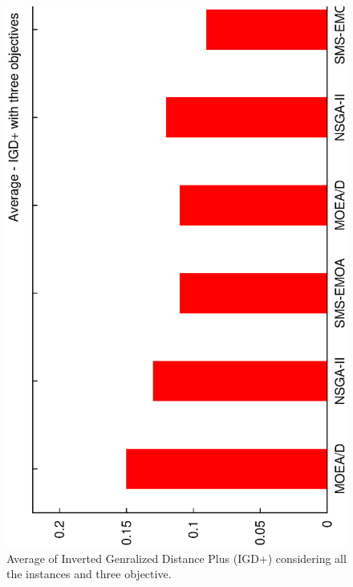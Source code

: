 \begin{figure}[]
\centering
\includegraphics[scale=0.25,angle=-90]{img/bar_IGD_3obj.eps}
\caption{Average of Inverted Genralized Distance Plus (IGD+) considering all the instances and three objective.}
\label{fig_sim}
\end{figure}
